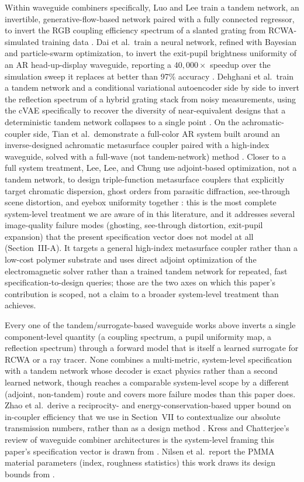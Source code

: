 \documentclass[10pt,twocolumn]{article}
\begin{document}
Within waveguide combiners specifically, Luo and Lee train a tandem network,
an invertible, generative-flow-based network paired with a
fully connected regressor, to invert the RGB coupling
efficiency spectrum of a slanted grating from RCWA-simulated training data
\cite{luo2024}. Dai et al.\ train a neural network, refined with Bayesian
and particle-swarm optimization, to invert the exit-pupil brightness
uniformity of an AR head-up-display waveguide, reporting a $40{,}000\times$
speedup over the simulation sweep it replaces at better than 97\% accuracy
\cite{dai2025}. Dehghani et al.\ train a tandem network and a conditional
variational autoencoder side by side to invert the reflection spectrum of
a hybrid grating stack from noisy measurements, using the cVAE specifically
to recover the diversity of near-equivalent designs that a deterministic
tandem network collapses to a single point \cite{dehghani2025}. On the
achromatic-coupler side, Tian et al.\ demonstrate a full-color AR system
built around an inverse-designed achromatic metasurface coupler paired with
a high-index waveguide, solved with a full-wave (not tandem-network) method
\cite{tian2025}. Closer to a full system treatment, Lee, Lee, and Chung use
adjoint-based optimization, not a tandem network, to design triple-function
metasurface couplers that explicitly target chromatic dispersion, ghost
orders from parasitic diffraction, see-through scene distortion, and
eyebox uniformity together \cite{lee2025nanophotonics}: this is the most
complete system-level treatment we are aware of in this literature, and it
addresses several image-quality failure modes (ghosting, see-through
distortion, exit-pupil expansion) that the present specification vector
does not model at all (Section~III-A). It targets a general high-index
metasurface coupler rather than a low-cost polymer substrate and uses
direct adjoint optimization of the electromagnetic solver rather than a
trained tandem network for repeated, fast specification-to-design queries;
those are the two axes on which this paper's contribution is scoped, not a
claim to a broader system-level treatment than \cite{lee2025nanophotonics}
achieves.

Every one of the tandem/surrogate-based waveguide works above inverts a
single component-level quantity (a coupling spectrum, a pupil
uniformity map, a reflection spectrum) through a forward model
that is itself a learned surrogate for RCWA or a ray tracer. None combines
a multi-metric, system-level specification with a tandem network whose
decoder is exact physics rather than a second learned network, though
\cite{lee2025nanophotonics} reaches a comparable system-level scope by a
different (adjoint, non-tandem) route and covers more failure modes than
this paper does. Zhao et al.\
derive a reciprocity- and energy-conservation-based upper bound on
in-coupler efficiency that we use in Section~VII to contextualize our
absolute transmission numbers, rather than as a design method
\cite{zhao2024}. Kress and Chatterjee's review of waveguide combiner
architectures is the system-level framing this paper's specification
vector is drawn from \cite{kress2021}. Nilsen et al.\ report the PMMA
material parameters (index, roughness statistics) this work draws its
design bounds from \cite{nilsen2025}.
\end{document}
